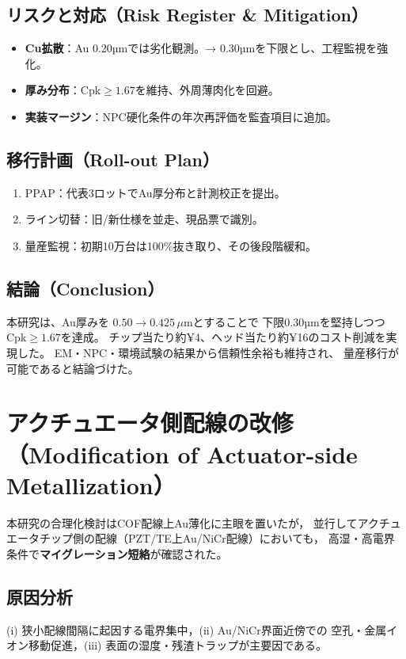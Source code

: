 \documentclass[conference]{IEEEtran}
\begin{document}
\subsection{リスクと対応（Risk Register \& Mitigation）}
\begin{itemize}
  \item \textbf{Cu拡散}：Au 0.20µmでは劣化観測。→ 0.30µmを下限とし、工程監視を強化。
  \item \textbf{厚み分布}：Cpk$\geq1.67$を維持、外周薄肉化を回避。
  \item \textbf{実装マージン}：NPC硬化条件の年次再評価を監査項目に追加。
\end{itemize}

\subsection{移行計画（Roll-out Plan）}
\begin{enumerate}
  \item PPAP：代表3ロットでAu厚分布と計測校正を提出。
  \item ライン切替：旧/新仕様を並走、現品票で識別。
  \item 量産監視：初期10万台は100\%抜き取り、その後段階緩和。
\end{enumerate}

\subsection{結論（Conclusion）}
本研究は、Au厚みを $0.50 \rightarrow 0.425\,\mu$mとすることで
下限0.30µmを堅持しつつCpk$\geq1.67$を達成。
チップ当たり約¥4、ヘッド当たり約¥16のコスト削減を実現した。
EM・NPC・環境試験の結果から信頼性余裕も維持され、
量産移行が可能であると結論づけた。

\appendices
\section{アクチュエータ側配線の改修（Modification of Actuator-side Metallization）}

本研究の合理化検討はCOF配線上Au薄化に主眼を置いたが，
並行してアクチュエータチップ側の配線（PZT/TE上Au/NiCr配線）においても，
高湿・高電界条件で\textbf{マイグレーション短絡}が確認された。

\subsection*{原因分析}
(i) 狭小配線間隔に起因する電界集中，(ii) Au/NiCr界面近傍での
空孔・金属イオン移動促進，(iii) 表面の湿度・残渣トラップが主要因である。
\end{document}
